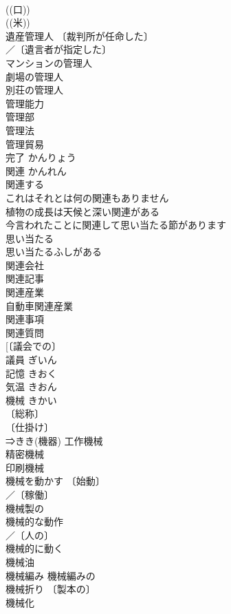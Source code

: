 \documentclass[8pt]{extreport}
\begin{document}
\begin{CJK}{UTF8}{min}
\\	((口)) 
\\	((米)) 
\\	遺産管理人 〔裁判所が任命した〕
\\	／〔遺言者が指定した〕
\\	マンションの管理人 
\\	劇場の管理人 
\\	別荘の管理人 
\\	管理能力 
\\	管理部 
\\	管理法 
\\	管理貿易 
\\	完了	かんりょう	
\\	関連	かんれん	
\\	関連する 
\\	これはそれとは何の関連もありません 
\\	植物の成長は天候と深い関連がある 
\\	今言われたことに関連して思い当たる節があります 
\\	思い当たる 
\\	思い当たるふしがある 
\\	関連会社 
\\	関連記事 
\\	関連産業 
\\	自動車関連産業 
\\	関連事項 
\\	関連質問 
\\	[〔議会での〕
\\	議員	ぎいん	
\\	記憶	きおく	
\\	気温	きおん	
\\	機械	きかい	
\\	〔総称〕
\\	〔仕掛け〕
\\	⇒きき(機器) 工作機械 
\\	精密機械 
\\	印刷機械 
\\	機械を動かす 〔始動〕
\\	／〔稼働〕
\\	機械製の 
\\	機械的な動作 
\\	／〔人の〕
\\	機械的に動く 
\\	機械油 
\\	機械編み 機械編みの 
\\	機械折り 〔製本の〕
\\	機械化 

\end{CJK}
\end{document}
